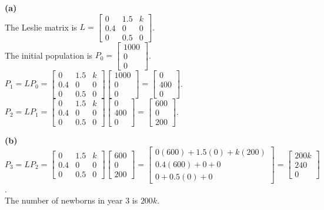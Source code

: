 \begin{solution}
\textbf{(a)} \\
The Leslie matrix is $L = \begin{bmatrix} 0 & 1.5 & k \\ 0.4 & 0 & 0 \\ 0 & 0.5 & 0 \end{bmatrix}$. \\
The initial population is $P_0 = \begin{bmatrix} 1000 \\ 0 \\ 0 \end{bmatrix}$. \\
$P_1 = L P_0 = \begin{bmatrix} 0 & 1.5 & k \\ 0.4 & 0 & 0 \\ 0 & 0.5 & 0 \end{bmatrix} \begin{bmatrix} 1000 \\ 0 \\ 0 \end{bmatrix} = \begin{bmatrix} 0 \\ 400 \\ 0 \end{bmatrix}$. \\
$P_2 = L P_1 = \begin{bmatrix} 0 & 1.5 & k \\ 0.4 & 0 & 0 \\ 0 & 0.5 & 0 \end{bmatrix} \begin{bmatrix} 0 \\ 400 \\ 0 \end{bmatrix} = \begin{bmatrix} 600 \\ 0 \\ 200 \end{bmatrix}$.

\medskip
\textbf{(b)} \\
$P_3 = L P_2 = \begin{bmatrix} 0 & 1.5 & k \\ 0.4 & 0 & 0 \\ 0 & 0.5 & 0 \end{bmatrix} \begin{bmatrix} 600 \\ 0 \\ 200 \end{bmatrix} = \begin{bmatrix} 0(600) + 1.5(0) + k(200) \\ 0.4(600) + 0 + 0 \\ 0 + 0.5(0) + 0 \end{bmatrix} = \begin{bmatrix} 200k \\ 240 \\ 0 \end{bmatrix}$. \\
The number of newborns in year 3 is $200k$.


\end{solution}
